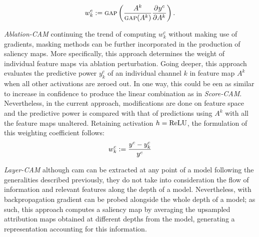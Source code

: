 \begin{equation}
	w^c_k \mathrel{:=} {\textsc{gap}} \left( \frac{A^k}{{\textsc{gap}}(A^k)}\frac{\partial^{}{y^c}}{\partial{{A^k}^{}}}\right).
	\label{eq:ax_cam}
\end{equation}

\noindent \emph{Ablation-CAM} \autocite{ablationcam} continuing the trend of computing $w^c_k$ 
without making use of gradients, masking methods can be further incorporated in the production of 
saliency maps. More specifically, this approach determines the weight of individual feature maps 
via ablation perturbation. Going deeper, this approach evaluates the predictive power $y^c_k$ of an 
individual channel $k$ in feature map $A^k$ when all other activations are zeroed out. In one way, 
this could be een as similar to increase in confidence to produce the linear combination as in 
\emph{Score-CAM}. Nevertheless, in the current approach, modifications are done on feature space 
and the predictive power is compared with that of predictions using $A^k$ with all the feature maps 
unaltered. Retaining activation $h = {\operatorname{ReLU}}$, the formulation of this weighting coefficient follows:
\begin{equation}
	w^c_k \mathrel{:=} \frac{y^c-y^c_k}{y^c}
\end{equation}

\noindent \emph{Layer-CAM} \autocite{jiang2021layercam} although \gls{cam} can be extracted at any 
point of a model following the generalities described previously, they do not take into 
consideration the flow of information and relevant features along the depth of a model. 
Nevertheless, with backpropagation gradient can be probed alongside the whole depth of a model; as 
such, this approach computes a saliency map by averaging the upsampled attribution maps obtained at 
different depths from the model, generating a representation accounting for this information.

